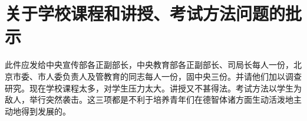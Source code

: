 \section[关于学校课程和讲授、考试方法问题的批示（在北京铁路二中调查材料的批示）（一九六四年三月十日）]{关于学校课程和讲授、考试方法问题的批示}


此件应发给中央宣传部各正副部长，中央教育部各正副部长、司局长每人一份，北京市委、市人委负责人及管教育的同志每人一份，固中央三份。并请他们加以调查研究。现在学校课程太多，对学生压力太大。讲授又不甚得法。考试方法以学生为敌人，举行突然袭击。这三项都是不利于培养青年们在德智体诸方面生动活泼地主动地得到发展的。

